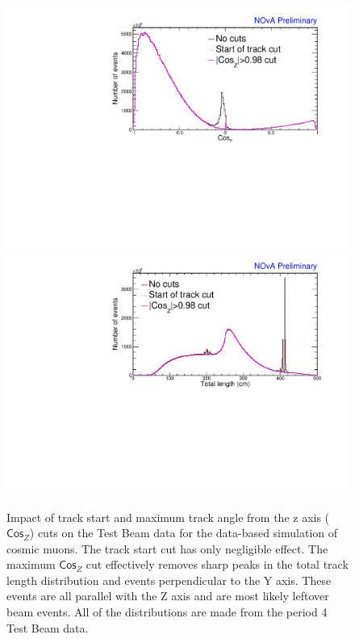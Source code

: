 \begin{enumerate}
\begin{figure}[!ht]
\includegraphics[width=\textwidth]{Plots/TBCalibration/DBSim_SelectionComparisonCosZCut_CosY.pdf}
\includegraphics[width=\textwidth]{Plots/TBCalibration/DBSim_SelectionComparisonCosZCut_TotLength.pdf}
\caption[Track start and $\textsf{Cos}_Z$ cut for data-based simulation selection]{Impact of track start and maximum track angle from the z axis ($\textsf{Cos}_Z$) cuts on the Test Beam data for the data-based simulation of cosmic muons. The track start cut has only negligible effect. The maximum $\textsf{Cos}_Z$ cut effectively removes sharp peaks in the total track length distribution and events perpendicular to the Y axis. These events are all parallel with the Z axis and are most likely leftover beam events. All of the distributions are made from the period 4 Test Beam data.}
\label{fig:DataBasedSimCosZSelectionComparison}
\end{figure}


\end{enumerate}
